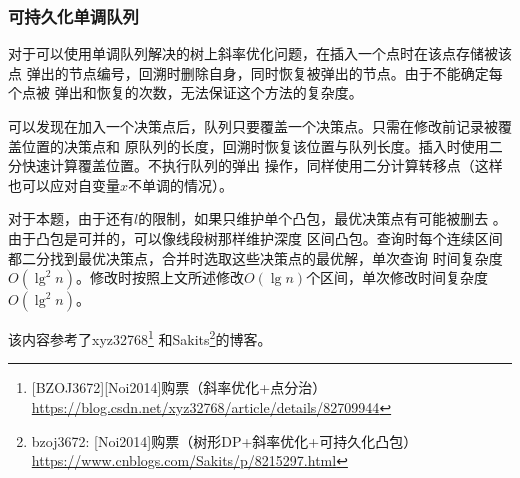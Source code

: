 \subsubsection{可持久化单调队列}
对于可以使用单调队列解决的树上斜率优化问题，在插入一个点时在该点存储被该点
弹出的节点编号，回溯时删除自身，同时恢复被弹出的节点。由于不能确定每个点被
弹出和恢复的次数，无法保证这个方法的复杂度。

可以发现在加入一个决策点后，队列只要覆盖一个决策点。只需在修改前记录被覆盖位置的决策点和
原队列的长度，回溯时恢复该位置与队列长度。插入时使用二分快速计算覆盖位置。不执行队列的弹出
操作，同样使用二分计算转移点（这样也可以应对自变量$x$不单调的情况）。

对于本题，由于还有$l$的限制，如果只维护单个凸包，最优决策点有可能被删去
。由于凸包是可并的，可以像线段树那样维护深度
区间凸包。查询时每个连续区间都二分找到最优决策点，合并时选取这些决策点的最优解，单次查询
时间复杂度$O(\lg^2 n)$。修改时按照上文所述修改$O(\lg n)$个区间，单次修改时间复杂度
$O(\lg^2 n)$。

该内容参考了xyz32768\footnote{
    [BZOJ3672][Noi2014]购票（斜率优化+点分治）\\
    \url{https://blog.csdn.net/xyz32768/article/details/82709944}
}
和Sakits\footnote{
    bzoj3672: [Noi2014]购票（树形DP+斜率优化+可持久化凸包）\\
    \url{https://www.cnblogs.com/Sakits/p/8215297.html}
}的博客。
